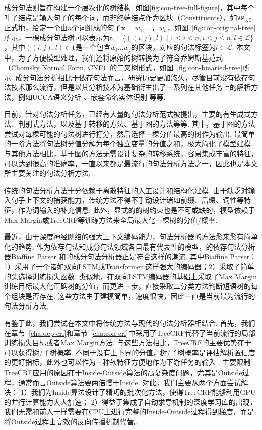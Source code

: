 
成分句法则旨在构建一个层次化的树结构.
如图\ref{fig:con-tree-full-figure}，其中每个叶子结点是输入句子的每个词，而非终端结点作为区块（Constituents），如$\texttt{VP}_{3,5}$.
正式地，给定一个由$n$个词组成的句子$\boldsymbol{x}=w_1,\dots，w_{n}$，如图~\ref{fig:con-original-tree}所示，一棵成分句法树可以表示为$\boldsymbol{t}=\{((i, j),l)\mid 1\le i \le n,i \le j \le n,l \in \mathcal{L}\}$，其中$((i,j),l) \in \boldsymbol{t}$是一个包含$w_{i}...w_{j}$的区块，对应的句法标签为$l \in \mathcal{L}$.
本文中，为了方便模型处理，我们还将原始的树转换为了符合乔姆斯基范式（Chomsky Normal Form, CNF）的二叉树形式，如图~\ref{fig:con-binaried-tree}所示.
成分句法分析相比于依存句法而言，研究历史更加悠久，尽管目前没有依存句法技术那么流行，但是以其分析技术为基础衍生出了一系列在其他任务上的解析方法，例如UCCA语义分析 \citep{jiang-etal-2019-hlt}、嵌套命名实体识别 \citep{fu-etal-2021-nested}等等.

目前，针对句法分析任务，已经有大量的句法分析范式被提出，主要的有生成式方法、判别式方法，以及基于转移的方法、基于图的方法等等.
其中，基于图的方法尝试对每棵可能的句法树进行打分，然后选择一棵分值最高的树作为输出.
最简单的一阶方法将句法树分值分解为每个独立变量的分值之和，极大简化了模型建模.
与其他方法相比，基于图的方法无需设计复杂的转移系统，容易集成丰富的特征，可以达到很高的准确率，一直以来都是最流行的句法分析方法之一，因此也是本文所主要关注的句法分析方法.

传统的句法分析方法十分依赖于离散特征的人工设计和结构化建模.
由于缺乏对输入句子上下文的捕获能力，传统方法不得不手动设计诸如前缀、后缀、词性等特征，作为词输入的补充信息.
此外，显式的的树约束也是不可或缺的，模型依赖于Max Margin或TreeCRF等训练方法来全局最大化一棵树的分值/概率.

最近，由于深度神经网络的强大上下文编码能力，句法分析器的方法愈来愈有简单化的趋势.
作为依存句法和成分句法领域各自最有代表性的模型，\citet{dozat-etal-2017-biaffine}的依存句法分析器Biaffine Parser 和\citet{stern-etal-2017-minimal}的成分句法分析器正是符合这样的潮流.
其中Biaffine Parser： 1）采用了一个诸如双向LSTM或Transformer \citep{vaswani-2017-attention}这样强大的编码器；2）采取了简单的头选择训练损失函数.
类似地，\citet{stern-etal-2017-minimal}在双向LSTM编码器的基础上采取了Max Margin训练目标最大化正确树的分值，而\citet{gaddy-etal-2018-whats}更进一步，直接采取二分类方法判断短语树的每个组块是否存在.
这些方法由于建模简单，速度很快，因此一直是当前最为流行的句法分析方法.

有鉴于此，我们尝试在本文中将传统方法与现代的句法分析器相结合.
首先，我们在章节~\ref{cha:dep-crf}和章节~\ref{cha:con-crf}中采用了TreeCRF代替了当前流行的局部训练损失目标或者Max Margin方法.
与这些方法相比，TreeCRF的主要优势在于可以获得树/子树概率.
不同于没有上下界的分值，树/子树概率是评估解析置信度的更好指标，此外也可以作为一种软特征方便地作为下游任务的输入 \citep{zhang-etal-2019-syntax,zhang-etal-2020-syntax}.
主要限制TreeCRF应用的原因在于Inside-Outside算法的高复杂度问题，尤其是Outside过程，通常而言Outside算法要两倍慢于Inside.
对此，我们主要从两个方面尝试解决：
1）我们为Inside算法设计了精巧的批次化方法，使得TreeCRF能够利用GPU的并行计算能力大大加速；
2）得益于集成了自动求导机制的深度学习库的出现，我们无需和前人一样需要在CPU上进行完整的Inside-Outside过程得到梯度，而是将Outside过程由高效的反向传播机制代替。


